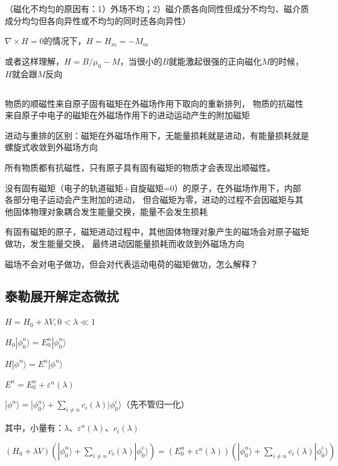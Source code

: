 （磁化不均匀的原因有：1）外场不均；2）磁介质各向同性但成分不均匀、磁介质成分均匀但各向异性或不均匀的同时还各向异性）

\bigskip

$\nabla \times H=0$的情况下，$H=H_m=-M_m$

\bigskip

或者这样理解，$H=B/\mu_0-M$，当很小的$B$就能激起很强的正向磁化$M$的时候，$H$就会跟$M$反向


\subsection{}

物质的顺磁性来自原子固有磁矩在外磁场作用下取向的重新排列，
物质的抗磁性来自原子中电子的磁矩在外磁场作用下的进动运动产生的附加磁矩

进动与重排的区别：磁矩在外磁场作用下，无能量损耗就是进动，有能量损耗就是螺旋式收敛到外磁场方向

所有物质都有抗磁性，只有原子具有固有磁矩的物质才会表现出顺磁性。

没有固有磁矩（电子的轨道磁矩+自旋磁矩=0）的原子，在外磁场作用下，内部各部分电子运动会产生附加的进动，
但合磁矩为零，进动的过程不会因磁矩与其他固体物理对象耦合发生能量交换，能量不会发生损耗

有固有磁矩的原子，磁矩进动过程中，其他固体物理对象产生的磁场会对原子磁矩做功，发生能量交换，
最终进动因能量损耗而收敛到外磁场方向

\bigskip

磁场不会对电子做功，但会对代表运动电荷的磁矩做功，怎么解释？


\subsection{泰勒展开解定态微扰}

$H=H_0+\lambda V, 0<\lambda\ll 1$

$H_0|\phi_0^n\rangle=E_0^n|\phi_0^n\rangle$

$H|\phi^n\rangle=E^n|\phi^n\rangle$

\bigskip

$E^n=E_0^n+\varepsilon^n(\lambda)$

$|\phi^n\rangle=|\phi_0^n\rangle+\sum_{i\neq n}c_i(\lambda)|\phi_0^i\rangle$（先不管归一化）

其中，小量有：$\lambda$、$\varepsilon^n(\lambda)$、$c_i(\lambda)$

\bigskip

$(H_0+\lambda V)(|\phi_0^n\rangle+\sum_{i\neq n}c_i(\lambda)|\phi_0^i\rangle)=(E_0^n+\varepsilon^n(\lambda))(|\phi_0^n\rangle+\sum_{i\neq n}c_i(\lambda)|\phi_0^i\rangle)$

